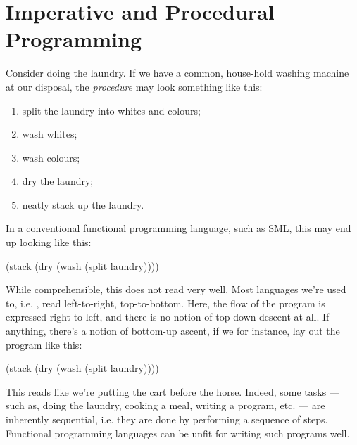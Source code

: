 \chapter{Imperative and Procedural Programming}

Consider doing the laundry. If we have a common, house-hold washing machine at
our disposal, the \emph{procedure} may look something like this:

\begin{enumerate}

\item split the laundry into whites and colours;

\item wash whites;

\item wash colours;

\item dry the laundry;

\item neatly stack up the laundry.

\end{enumerate}

In a conventional functional programming language, such as SML, this may end up
looking like this:

\begin{code}
(stack (dry (wash (split laundry))))
\end{code}

While comprehensible, this does not read very well. Most languages we're used
to, i.e. , read
left-to-right, top-to-bottom. Here, the flow of the program is expressed
right-to-left, and there is no notion of top-down descent at all. If anything,
there's a notion of bottom-up ascent, if we for instance, lay out the program
like this:

\begin{code}
(stack
  (dry
    (wash
      (split laundry))))
\end{code}

This reads like we're putting the cart before the horse. Indeed, some tasks ---
such as, doing the laundry, cooking a meal, writing a program, etc. --- are
inherently sequential, i.e. they are done by performing a sequence of steps.
Functional programming languages can be  unfit for writing such programs well.

